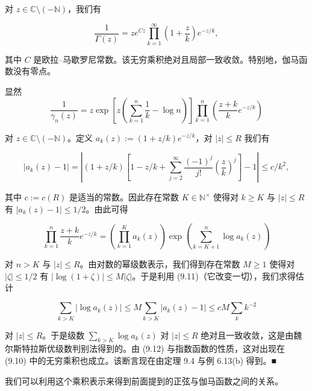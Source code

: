 \begin{proposition}

对 $ z \in \mathbb{C}\setminus(-\mathbb{N}) $，我们有

\begin{equation}
\frac{1}{\Gamma(z)} = z e^{Cz} \prod_{k=1}^{\infty} \left( 1 + \frac{z}{k} \right) e^{-z/k} ,\tag{9.10}
\end{equation}

其中 $ C $ 是欧拉–马歇罗尼常数。该无穷乘积绝对且局部一致收敛。特别地，伽马函数没有零点。

\proofhead
显然
\[
\frac{1}{\gamma_n(z)} = z\exp\left[ z \left( \sum_{k=1}^{n} \frac{1}{k} - \log n \right) \right] \prod_{k=1}^{n} \left( \frac{z+k}{k} e^{-z/k} \right)
\]

对 $ z \in \mathbb{C}\setminus(-\mathbb{N}) $。定义 $ a_k(z) := (1 + z/k)e^{-z/k} $，对 $ |z| \le R $ 我们有

\begin{equation}
\left| a_k(z) - 1 \right| = \left| (1 + z/k) \left[ 1 - z/k + \sum_{j=2}^{\infty} \frac{(-1)^{j}}{j!} \left( \frac{z}{k} \right)^{j} \right] - 1 \right| \le c/k^{2} ,\tag{9.11}
\end{equation}

其中 $ c := c(R) $ 是适当的常数。因此存在常数 $ K \in \mathbb{N}^{\times} $ 使得对 $ k \ge K $ 与 $ |z| \le R $ 有 $ |a_k(z) - 1| \le 1/2 $。由此可得

\begin{equation}
\prod_{k=1}^{n} \frac{z+k}{k} e^{-z/k} = \left( \prod_{k=1}^{K} a_k(z) \right) \exp\left( \sum_{k=K+1}^{n} \log a_k(z) \right)\tag{9.12}
\end{equation}

对 $ n > K $ 与 $ |z| \le R $。由对数的幂级数表示，我们得到存在常数 $ M \ge 1 $ 使得对 $ |\zeta| \le 1/2 $ 有 $ |\log(1+\zeta)| \le M|\zeta| $。于是利用 (9.11)（它改变一切），我们求得估计

\[
\sum_{k>K} \left| \log a_k(z) \right| \le M \sum_{k>K} \left| a_k(z) - 1 \right| \le cM \sum_{k} k^{-2}
\]

对 $ |z| \le R $。于是级数 $ \sum_{k>K} \log a_k(z) $ 对 $ |z| \le R $ 绝对且一致收敛，这是由魏尔斯特拉斯优级数判别法得到的。由 (9.12) 与指数函数的性质，这对出现在 (9.10) 中的无穷乘积也成立。该断言现在由定理 9.4 与例 6.13(b) 得到。\nobreak\hspace{0.35em}■

\end{proposition}

我们可以利用这个乘积表示来得到前面提到的正弦与伽马函数之间的关系。

